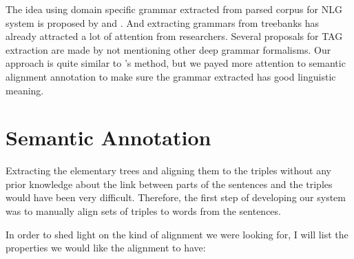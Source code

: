 \documentclass[a4paper]{article}
\begin{document}
The idea using domain specific grammar extracted from parsed corpus for NLG system is proposed by \citet{DeVault2008a} and \citet{DeVault2008}. And extracting grammars from treebanks has already attracted a lot of attention from researchers. Several proposals for TAG extraction are made by \citet{Xia2001,Xia1999,Xia2006,Chen} not mentioning other deep grammar formalisms. Our approach is quite similar to \citet{DeVault2008a}'s method, but we payed more attention to semantic alignment annotation to make sure the grammar extracted has good linguistic meaning.


\section{Semantic Annotation}
\label{sec:sem-annot}

Extracting the elementary trees and aligning them to the triples
without any prior knowledge about the link between parts of the
sentences and the triples would have been very difficult. Therefore,
the first step of developing our system was to manually align sets of
triples to words from the sentences.

In order to shed light on the kind of alignment we were looking for, I
will list the properties we would like the alignment to have:
\end{document}
